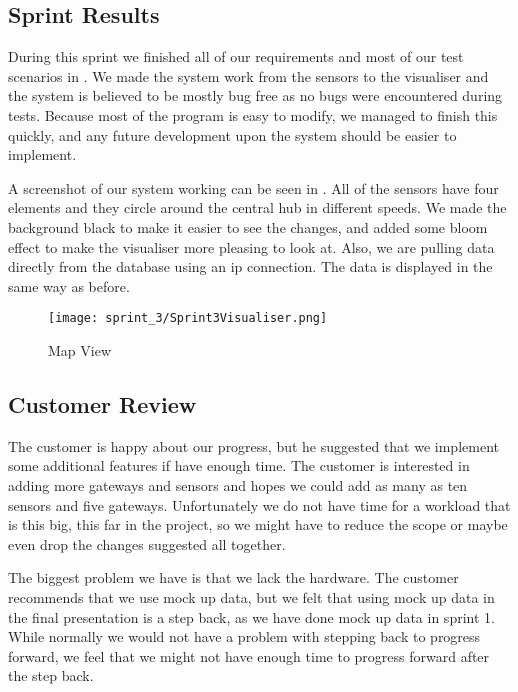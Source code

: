\documentclass[../document]{subfiles}
\begin{document}
\subsection{Sprint Results}
During this sprint we finished all of our requirements  and most of our test scenarios in . We made the system work from the sensors to the visualiser and the system is believed to be mostly bug free as no bugs were encountered during tests. Because most of the program is easy to modify, we managed to finish this quickly, and any future development upon the system should be easier to implement.

A screenshot of our system working can be seen in . All of the sensors have four elements and they circle around the central hub in different speeds. We made the background black to make it easier to see the changes, and added some bloom effect to make the visualiser more pleasing to look at. Also, we are pulling data directly from the database using an ip connection. The data is displayed in the same way as before. 

\begin{figure}
	\centering
	\texttt{[image: sprint\_3/Sprint3Visualiser.png]}
	\caption{Map View}
	\label{fig:map_view_3}
\end{figure}

\subsection{Customer Review}
The customer is happy about our progress, but he suggested that we implement some additional features if have enough time. The customer is interested in adding more gateways and sensors and hopes we could add as many as ten sensors and five gateways. Unfortunately we do not have time for a workload that is this big, this far in the project, so we might have to reduce the scope or maybe even drop the changes suggested all together.

The biggest problem we have is that we lack the hardware. The customer recommends that we use mock up data, but we felt that using mock up data in the final presentation is a step back, as we have done mock up data in sprint 1. While normally we would not have a problem with stepping back to progress forward, we feel that we might not have enough time to progress forward after the step back.
\end{document}
